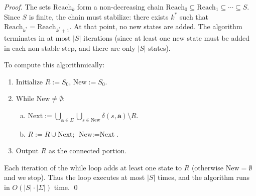 \begin{enumerate}[{4.}1.]
\begin{enumerate}[(a)]
  \begin{proof}
  The sets $\text{Reach}_k$ form a non-decreasing chain
  $\text{Reach}_0\subseteq\text{Reach}_1\subseteq\cdots\subseteq S$.
  Since $S$ is finite, the chain must stabilize: there exists $k^*$ such that
  $\text{Reach}_{k^*}=\text{Reach}_{k^*+1}$.  At that point, no new states are
  added.  The algorithm terminates in at most $|S|$ iterations (since at least
  one new state must be added in each non-stable step, and there are only $|S|$
  states).

  To compute this algorithmically:
  \begin{enumerate}[1.]
    \item Initialize $R:=S_0$, $\text{New}:=S_0$.
    \item While $\text{New}\neq\emptyset$:
      \begin{enumerate}[(a)]
        \item $\text{Next}:=\bigcup_{\pmb{a}\in\Sigma}\bigcup_{s\in\text{New}}
              \delta(s,\pmb{a})\setminus R$.
        \item $R:=R\cup\text{Next}$; $\text{New}:=\text{Next}$.
      \end{enumerate}
    \item Output $R$ as the connected portion.
  \end{enumerate}
  Each iteration of the while loop adds at least one state to $R$ (otherwise
  $\text{New}=\emptyset$ and we stop).  Thus the loop executes at most $|S|$
  times, and the algorithm runs in $O(|S|\cdot|\Sigma|)$ time. \qed
  \end{proof}
\end{enumerate}

\end{enumerate}
